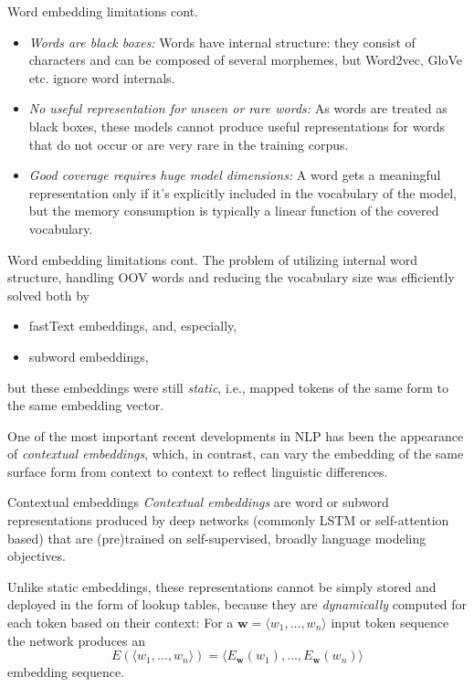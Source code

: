 \documentclass[style=upen, size=14pt]{powerdot}
\newcommand{\gold}{\color{arany}}
\theoremstyle{definition}
\begin{document}
\begin{slide}[toc=]{Word embedding limitations cont.}
  \begin{itemize}
  \item \emph{\gold Words are black boxes:} Words have internal structure: they
    consist of characters and can be composed of several morphemes, but
    Word2vec, GloVe etc. ignore word internals.
  \item \emph{\gold No useful representation for unseen or rare words:} As words
    are treated as black boxes, these models cannot produce useful
    representations for words that do not occur or are very rare in the training
    corpus.
  \item \emph{\gold Good coverage requires huge model dimensions:} A word gets a
    meaningful representation only if it's explicitly included in the vocabulary
    of the model, but the memory consumption is typically a linear function of
    the covered vocabulary.
  \end{itemize}
\end{slide}

\begin{slide}[toc=]{Word embedding limitations cont.}
  The problem of utilizing internal word structure, handling OOV words and
  reducing the vocabulary size was efficiently solved both by
  \begin{itemize}
  \item fastText embeddings, and, especially,
  \item subword embeddings,
  \end{itemize}
  but these embeddings were still \emph{\gold static}, i.e., mapped tokens
  of the same form to the same embedding vector.

  One of the most important recent developments in NLP has been the appearance
  of \emph{\gold contextual embeddings}, which, in contrast, can vary the
  embedding of the same surface form from context to context to reflect
  linguistic differences.
\end{slide}

\begin{slide}[toc=Contextual embeddings]{Contextual embeddings}
  \emph{\gold Contextual embeddings} are word or subword representations
  produced by deep networks (commonly LSTM or self-attention based) that are
  (pre)trained on self-supervised, broadly language modeling objectives.
  \bigskip

  Unlike static embeddings, these representations cannot be simply stored and
  deployed in the form of lookup tables, because they are \emph{dynamically}
  computed for each token based on their context: For a
  $\mathbf{w} = \langle w_1,\dots ,w_n \rangle$ input token sequence the network
  produces an
  $$
  E(\langle w_1,\dots ,w_n \rangle) = \langle
  E_\mathbf{w}(w_1),\dots,E_\mathbf{w}(w_n)\rangle
  $$
  embedding sequence.
\end{slide}
\end{document}
